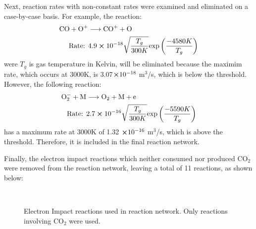 \documentclass[twocolumn,10pt,a4paper]{article}
\begin{document}
Next, reaction rates with non-constant rates were examined and eliminated on
a case-by-case basis. For example, the reaction:
\begin{align*}
        \text{CO} + \text{O}^+ &\longrightarrow \text{CO}^+ + \text{O}\\
        \text{Rate:   }& 4.9 \cross 10^{-18}\sqrt{\frac{T_g}{300K}}
            \text{exp}\left(\frac{-4580K}{T_g}\right)
\end{align*}
were $T_g$ is gas temperature in Kelvin, will be eliminated because the maximim
rate, which occurs at 3000K, is 3.07$\cross 10^{-18}$ m$^3$/s, which is below the
threshold. However, the following reaction:
\begin{align*}
        \text{O}_2^-   + \text{M} &\longrightarrow \text{O}_2 + \text{M} + \text{e}\\
        \text{Rate:   }& 2.7 \cross 10^{-16}\sqrt{\frac{T_g}{300K}}
            \text{exp}\left(\frac{-5590K}{T_g}\right)
\end{align*}
has a maximum rate at 3000K of 1.32 $\cross 10^{-16}$ m$^{3}$/s, which is
above the threshold. Therefore, it is included in the final reaction network.

Finally, the electron impact reactions which neither consumed nor produced CO$_2$
were removed from the reaction network, leaving a total of 11 reactions, as shown
below:

\begin{figure}[!htb]
\begin{center}
\\
\caption{Electron Impact reactions used in reaction network. Only reactions
        involving CO$_2$ were used.}
\end{center}
\end{figure}
\end{document}

